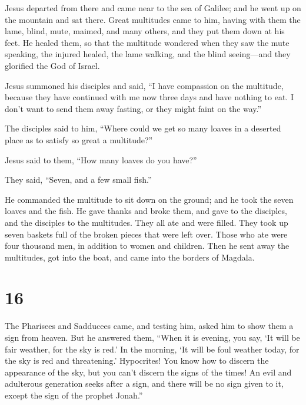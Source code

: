  Jesus departed from there and came near to the sea of
Galilee; and he went up on the mountain and sat there. 
Great multitudes came to him, having with them the lame, blind, mute,
maimed, and many others, and they put them down at his feet. He healed
them,  so that the multitude wondered when they saw the
mute speaking, the injured healed, the lame walking, and the blind
seeing---and they glorified the God of Israel.

 Jesus summoned his disciples and said, ``I have
compassion on the multitude, because they have continued with me now
three days and have nothing to eat. I don't want to send them away
fasting, or they might faint on the way.''

 The disciples said to him, ``Where could we get so many
loaves in a deserted place as to satisfy so great a multitude?''

 Jesus said to them, ``How many loaves do you have?''

They said, ``Seven, and a few small fish.''

 He commanded the multitude to sit down on the ground;
 and he took the seven loaves and the fish. He gave
thanks and broke them, and gave to the disciples, and the disciples to
the multitudes.  They all ate and were filled. They took
up seven baskets full of the broken pieces that were left over.
 Those who ate were four thousand men, in addition to
women and children.  Then he sent away the multitudes,
got into the boat, and came into the borders of Magdala.

\hypertarget{section-15}{%
\section{16}\label{section-15}}

 The Pharisees and Sadducees came, and testing him, asked
him to show them a sign from heaven.  But he answered
them, ``When it is evening, you say, `It will be fair weather, for the
sky is red.'  In the morning, `It will be foul weather
today, for the sky is red and threatening.' Hypocrites! You know how to
discern the appearance of the sky, but you can't discern the signs of
the times!  An evil and adulterous generation seeks after
a sign, and there will be no sign given to it, except the sign of the
prophet Jonah.''

